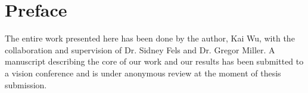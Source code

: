
\chapter{Preface}

The entire work presented here has been done by the author, Kai Wu, with the collaboration and supervision of Dr. Sidney Fels and Dr. Gregor Miller. A manuscript describing the core of our work and our results has been submitted to a vision conference and is under anonymous review at the moment of thesis submission.
